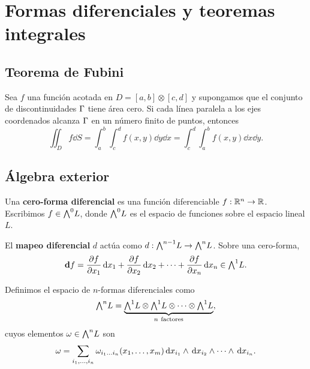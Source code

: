 \section{Formas diferenciales y teoremas integrales}
\label{sec:formas_diferenciales}

\subsection{Teorema de Fubini}
\label{subsec:fubini}

\begin{teorema}[Fubini]
  \label{teo:fubini}
  Sea $f$ una funci\'on acotada en $D=[a,b]\otimes[c,d]$ y supongamos que el
  conjunto de discontinuidades $\Gamma$ tiene \'area cero. Si cada l\'inea
  paralela a los ejes coordenados alcanza $\Gamma$ en un n\'umero finito de
  puntos, entonces
  \begin{equation}
    \label{eq:fubini}
    \iint_{D}f\dd S
      =\int_{a}^{b}\!\!\int_{c}^{d}f(x,y)\dd y\dd x
      =\int_{c}^{d}\!\!\int_{a}^{b}f(x,y)\dd x\dd y .
  \end{equation}
\end{teorema}

\subsection{\'Algebra exterior}
\label{subsec:algebra_exterior}

\begin{definicion}
  \label{def:cero_forma}
  Una \textbf{cero-forma diferencial} es una funci\'on diferenciable
  $f:\mathbb{R}^n\rightarrow\mathbb{R}$. Escribimos $f\in\textstyle\bigwedge^{0}\!L$, donde $\textstyle\bigwedge^{0}\!L$ es el
  espacio de funciones sobre el espacio lineal $L$.
\end{definicion}

\begin{definicion}
  \label{def:mapeo_diferencial}
  El \textbf{mapeo diferencial} $d$ act\'ua como
  $d:\textstyle\bigwedge^{n-1}\!L\rightarrow\textstyle\bigwedge^{n}\!L$. Sobre una cero-forma,
  \begin{equation}
    \label{eq:d_cero_forma}
    \mathbf{d}f=\frac{\partial f}{\partial x_1}\,\mathrm{d} x_1+\frac{\partial f}{\partial x_2}\,\mathrm{d} x_2
      +\dots+\frac{\partial f}{\partial x_n}\,\mathrm{d} x_n\in\textstyle\bigwedge^{1}\!L.
  \end{equation}
\end{definicion}

\begin{definicion}[$n$-formas]
  \label{def:n_formas}
  Definimos el espacio de $n$-formas diferenciales como
  \begin{equation}
    \label{eq:espacio_n_formas}
    \textstyle\bigwedge^{n}\!L=\underbrace{\textstyle\bigwedge^{1}\!L\otimes\textstyle\bigwedge^{1}\!L\otimes\dots\otimes\textstyle\bigwedge^{1}\!L}
      _{n\ \text{factores}} ,
  \end{equation}
  cuyos elementos $\omega\in\textstyle\bigwedge^{n}\!L$ son
  \begin{equation}
    \label{eq:n_forma}
    \small
    \omega=\sum_{i_1,\dots,i_n}
      \omega_{i_1\dots i_n}(x_1,\dots,x_m)
      \,\mathrm{d} x_{i_1}\wedge\,\mathrm{d} x_{i_2}\wedge\dots\wedge\,\mathrm{d} x_{i_n}.
  \end{equation}
\end{definicion}


